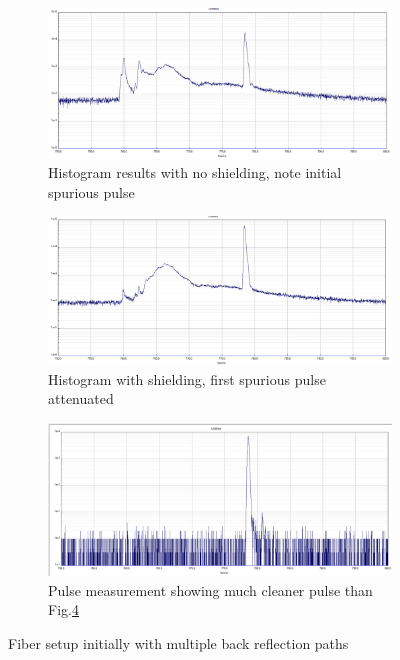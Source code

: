 \documentclass[a4paper]{article}
\begin{document}
\begin{figure}
     \centering
     \begin{subfigure}[b]{1.0\textwidth}
         \centering
         \includegraphics[width=\textwidth]{figures/550_no_hand.PNG}
         \caption{Histogram results with no shielding, note initial spurious pulse}
         \label{fig:fiber_graph_no_hand}
     \end{subfigure}
     \hfill
     \begin{subfigure}[b]{1.0\textwidth}
         \centering
         \includegraphics[width=\textwidth]{figures/550-actually covered.PNG}
         \caption{Histogram with shielding, first spurious pulse attenuated}
         \label{fig:fiber_graph_hand}
     \end{subfigure}
     \hfill
     \begin{subfigure}[b]{1.0\textwidth}
         \centering
         \includegraphics[width=\textwidth]{figures/pulse_clear.PNG}
         \caption{Pulse measurement showing much cleaner pulse than Fig.\ref{fig:fiber_graphs}}
         \label{fig:fiber_output_shielded}
     \end{subfigure}
        \caption{Fiber setup initially with multiple back reflection paths}
        \label{fig:fiber_graphs}
\end{figure}
\end{document}
